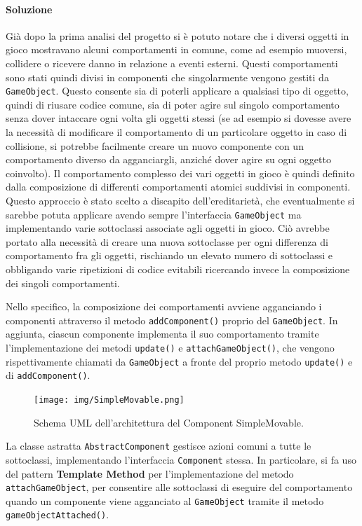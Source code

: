 \documentclass[a4paper,12pt]{report}
\begin{document}
\paragraph*{Soluzione}
Già dopo la prima analisi del progetto si è potuto notare che i diversi oggetti in gioco mostravano alcuni comportamenti in comune, come ad esempio muoversi, collidere o ricevere danno in relazione a eventi esterni.
Questi comportamenti sono stati quindi divisi in componenti che singolarmente vengono gestiti da \texttt{GameObject}.
Questo consente sia di poterli applicare a qualsiasi tipo di oggetto, quindi di riusare codice comune, sia di poter agire sul singolo comportamento senza dover intaccare ogni volta gli oggetti stessi (se ad esempio si dovesse avere la necessità di modificare il comportamento di un particolare oggetto in caso di collisione, si potrebbe facilmente creare un nuovo componente con un comportamento diverso da agganciargli, anziché dover agire su ogni oggetto coinvolto).
Il comportamento complesso dei vari oggetti in gioco è quindi definito dalla composizione di differenti comportamenti atomici suddivisi in componenti.
Questo approccio è stato scelto a discapito dell'ereditarietà, che eventualmente si sarebbe potuta applicare avendo sempre l'interfaccia \texttt{GameObject} ma implementando varie sottoclassi associate agli oggetti in gioco. Ciò avrebbe portato alla necessità di creare una nuova sottoclasse per ogni differenza di comportamento fra gli oggetti, rischiando un elevato numero di sottoclassi e obbligando varie ripetizioni di codice evitabili ricercando invece la composizione dei singoli comportamenti.

Nello specifico, la composizione dei comportamenti avviene agganciando i componenti attraverso il metodo \texttt{addComponent()} proprio del \texttt{GameObject}. In aggiunta, ciascun componente implementa il suo comportamento tramite l'implementazione dei metodi \texttt{update()} e \texttt{attachGameObject()}, che vengono rispettivamente chiamati da \texttt{GameObject} a fronte del proprio metodo \texttt{update()} e di \texttt{addComponent()}.
%
\begin{figure}
    \centering{}
    \texttt{[image: img/SimpleMovable.png]}
    \caption{Schema UML dell'architettura del Component SimpleMovable.}
    \label{fig:simple-movable}
\end{figure}
%

La classe astratta \texttt{AbstractComponent} gestisce azioni comuni a tutte le sottoclassi, implementando l'interfaccia \texttt{Component} stessa. In particolare, si fa uso del pattern \textbf{Template Method} per l'implementazione del metodo \texttt{attachGameObject}, per consentire alle sottoclassi di eseguire del comportamento quando un componente viene agganciato al \texttt{GameObject} tramite il metodo \texttt{gameObjectAttached()}.
\end{document}
